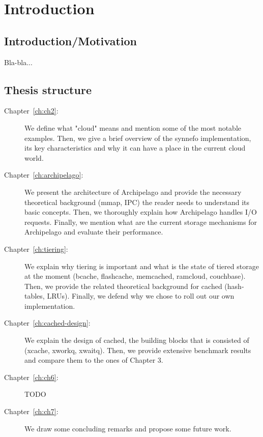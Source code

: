 \chapter{Introduction}\label{ch:intro}

\section{Introduction/Motivation}

Bla-bla...

\begin{comment}
Also, excuse me in advance for the extensive use of the second person form in 
the following chapters, as well as breaking the fourth wall between the writer 
and the reader. Although I tried to, I find it difficult to communicate the more 
\textit{humane} aspect of this thesis such as code decisions, pitfalls and 
shortcomings.  After all, there is "you" who reads this thesis and "I" who 
writes it and no amount of third person form can cover that.
\end{comment}

\section{Thesis structure}

\begin{description}
\item[Chapter~\ref{ch:ch2}:]
We define what "cloud" means and mention some of the most notable examples.
Then, we give a brief overview of the synnefo implementation, its key
characteristics and why it can have a place in the current cloud world.
\item[Chapter~\ref{ch:archipelago}:]
We present the architecture of Archipelago and provide the necessary theoretical
background (mmap, IPC) the reader needs to understand its basic concepts. Then,
we thoroughly explain how Archipelago handles I/O requests. Finally, we mention
what are the current storage mechanisms for Archipelago and evaluate their
performance.
\item[Chapter~\ref{ch:tiering}:]
We explain why tiering is important and what is the state of tiered storage at
the moment (bcache, flashcache, memcached, ramcloud, couchbase).  Then, we
provide the related theoretical background for cached (hash-tables, LRUs).
Finally, we defend why we chose to roll out our own implementation.
\item[Chapter~\ref{ch:cached-design}:]
We explain the design of cached, the building blocks that is consisted of
(xcache, xworkq, xwaitq). Then, we provide extensive benchmark results and
compare them to the ones of Chapter 3.
\item[Chapter~\ref{ch:ch6}:]
TODO
\item[Chapter~\ref{ch:ch7}:]
We draw some concluding remarks and propose some future work.
\end{description}
